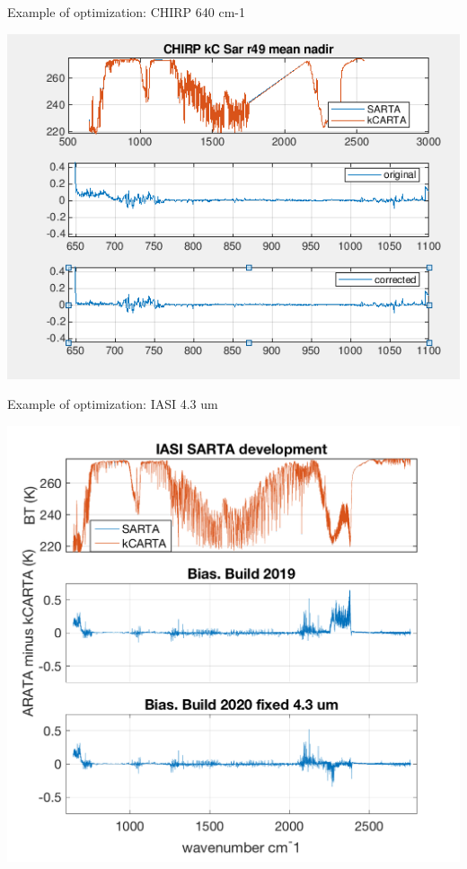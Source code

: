 \documentclass[10pt,t]{beamer}
\begin{document}
\begin{frame}{Example of optimization: CHIRP 640 cm-1}

  \begin{center}
    \includegraphics[width=0.6\linewidth]{./Figs/chirp_optimize1.png}
  \end{center}


\end{frame}
\begin{frame}{Example of optimization: IASI 4.3 um}

\vspace{-0.5cm}
  \begin{center}
    \includegraphics[width=0.6\linewidth]{./Figs/iasi_sarta_kcarta_mean_bias_4p3um_fx.png}
  \end{center}

\end{frame}
\end{document}
